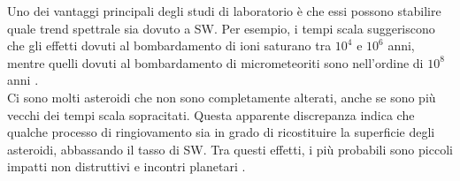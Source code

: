 
Uno dei vantaggi principali degli studi di laboratorio è che essi possono stabilire quale trend spettrale sia dovuto a SW. 
Per esempio, i tempi scala suggeriscono che gli effetti dovuti al bombardamento di ioni saturano tra $10^4$ e $10^6$ anni, mentre quelli dovuti al bombardamento di micrometeoriti sono nell'ordine di $10^8$ anni \citep{loeffler_irradiation_2009, brunetto_space_2006}.\\
Ci sono molti asteroidi che non sono completamente alterati, anche se sono più vecchi dei tempi scala sopracitati. Questa apparente discrepanza indica che qualche processo di ringiovamento sia in grado di ricostituire la superficie degli asteroidi, abbassando il tasso di SW. Tra questi effetti, i più probabili sono piccoli impatti non distruttivi e incontri planetari \citep{shestopalov_optical_2013}.

